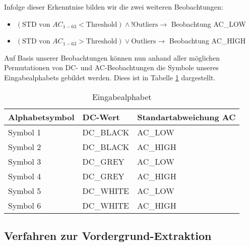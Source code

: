 Infolge dieser Erkenntnise bilden wir die zwei weiteren Beobachtungen:

\begin{itemize}
	\item $(\text{STD von }AC_{1-63} < \text{Threshold} ) \wedge !\text{Outliers} \rightarrow$  Beobachtung AC\_LOW
	\item $(\text{STD von }AC_{1-63} > \text{Threshold} ) \vee \text{Outliers} \rightarrow$  Beobachtung AC\_HIGH
\end{itemize}



Auf Basis unserer Beobachtungen können nun anhand aller möglichen Permutationen von DC- und AC-Beobachtungen die Symbole unseres Eingabealphabets gebildet werden. Diees ist in Tabelle \ref{table:eingabealphabet} dargestellt.

\begin{table}
	\label{table:eingabealphabet}
	\begin{center}
\begin{tabular}{|l|l|l|}
\hline
\textbf{Alphabetsymbol}&\textbf{DC-Wert}&\textbf{Standartabweichung AC}\\
\hline
Symbol 1&DC\_BLACK&AC\_LOW\\
\hline
Symbol 2&DC\_BLACK&AC\_HIGH\\
\hline
Symbol 3&DC\_GREY&AC\_LOW\\
\hline
Symbol 4&DC\_GREY&AC\_HIGH\\
\hline
Symbol 5&DC\_WHITE&AC\_LOW\\
\hline
Symbol 6&DC\_WHITE&AC\_HIGH\\
\hline
\end{tabular}
	\caption{Eingabealphabet}
\end{center}
\end{table}

\subsection{Verfahren zur Vordergrund-Extraktion}

